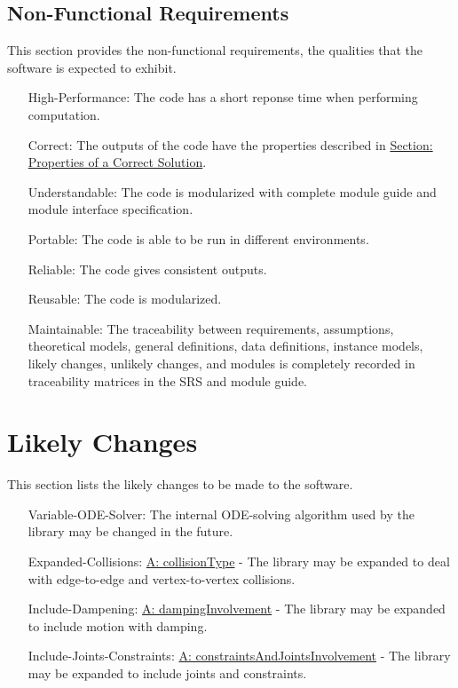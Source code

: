 \documentclass[12pt]{article}
\begin{document}
\subsection{Non-Functional Requirements}
\label{Sec:NFRs}
This section provides the non-functional requirements, the qualities that the software is expected to exhibit.
\begin{itemize}
\item[High-Performance:\phantomsection\label{highPerformance}]{The code has a short reponse time when performing computation.}
\item[Correct:\phantomsection\label{correct}]{The outputs of the code have the properties described in \hyperref[Sec:CorSolProps]{Section: Properties of a Correct Solution}.}
\item[Understandable:\phantomsection\label{understandable}]{The code is modularized with complete module guide and module interface specification.}
\item[Portable:\phantomsection\label{portable}]{The code is able to be run in different environments.}
\item[Reliable:\phantomsection\label{reliable}]{The code gives consistent outputs.}
\item[Reusable:\phantomsection\label{reusable}]{The code is modularized.}
\item[Maintainable:\phantomsection\label{maintainable}]{The traceability between requirements, assumptions, theoretical models, general definitions, data definitions, instance models, likely changes, unlikely changes, and modules is completely recorded in traceability matrices in the SRS and module guide.}
\end{itemize}
\section{Likely Changes}
\label{Sec:LCs}
This section lists the likely changes to be made to the software.
\begin{itemize}
\item[Variable-ODE-Solver:\phantomsection\label{lcVODES}]{The internal ODE-solving algorithm used by the library may be changed in the future.}
\item[Expanded-Collisions:\phantomsection\label{lcEC}]{\hyperref[assumpCT]{A: collisionType} - The library may be expanded to deal with edge-to-edge and vertex-to-vertex collisions.}
\item[Include-Dampening:\phantomsection\label{lcID}]{\hyperref[assumpDI]{A: dampingInvolvement} - The library may be expanded to include motion with damping.}
\item[Include-Joints-Constraints:\phantomsection\label{lcIJC}]{\hyperref[assumpCAJI]{A: constraintsAndJointsInvolvement} - The library may be expanded to include joints and constraints.}
\end{itemize}
\end{document}
